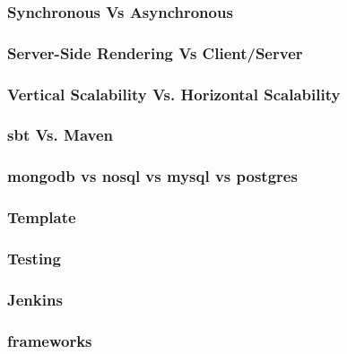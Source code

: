 \subsubsection{Synchronous Vs Asynchronous}
\subsubsection{Server-Side Rendering Vs Client/Server}
\subsubsection{Vertical Scalability Vs. Horizontal Scalability}
\subsubsection{sbt Vs. Maven}
\subsubsection{mongodb vs nosql vs mysql vs postgres}
\subsubsection{Template}
\subsubsection{Testing}
\subsubsection{Jenkins}
\subsubsection{frameworks}


